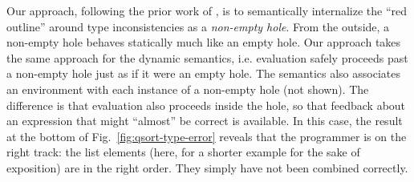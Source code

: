 Our approach, following the prior work of \citet{popl-paper}, 
is to semantically internalize the ``red outline'' around
type inconsistencies as a \emph{non-empty hole}.
From the outside, a non-empty hole behaves statically much like an empty hole.
Our approach takes the same approach for the dynamic semantics,
i.e. evaluation safely proceeds past a non-empty hole just as if it were an empty hole.
The semantics also associates an environment with each instance of a non-empty hole (not shown). 
The difference is that evaluation also proceeds inside the hole, so that 
feedback about an expression that might ``almost'' be correct is available. 
In this case, the result at the bottom of Fig.~\ref{fig:qsort-type-error}
reveals that the programmer is on the right track: the list elements 
(here, for a shorter example for the sake of exposition) are in the right order.
They simply have not been combined correctly.





